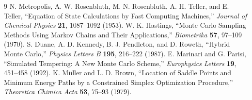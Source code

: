 \begin{thebibliography}{9}
N. Metropolis, A. W. Rosenbluth, M. N. Rosenbluth, A. H. Teller, and E. Teller, ``Equation of State Calculations by Fast Computing Machines,'' \emph{Journal of Chemical Physics} \textbf{21}, 1087--1092 (1953).
W. K. Hastings, ``Monte Carlo Sampling Methods Using Markov Chains and Their Applications,'' \emph{Biometrika} \textbf{57}, 97--109 (1970).
S. Duane, A. D. Kennedy, B. J. Pendleton, and D. Roweth, ``Hybrid Monte Carlo,'' \emph{Physics Letters B} \textbf{195}, 216--222 (1987).
E. Marinari and G. Parisi, ``Simulated Tempering: A New Monte Carlo Scheme,'' \emph{Europhysics Letters} \textbf{19}, 451--458 (1992).
K. M\"uller and L. D. Brown, ``Location of Saddle Points and Minimum Energy Paths by a Constrained Simplex Optimization Procedure,'' \emph{Theoretica Chimica Acta} \textbf{53}, 75--93 (1979).
\end{thebibliography}
